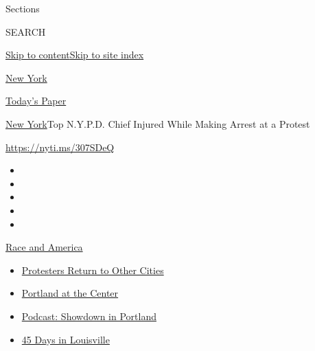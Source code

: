 Sections

SEARCH

\protect\hyperlink{site-content}{Skip to
content}\protect\hyperlink{site-index}{Skip to site index}

\href{https://www.nytimes3xbfgragh.onion/section/nyregion}{New York}

\href{https://myaccount.nytimes3xbfgragh.onion/auth/login?response_type=cookie\&client_id=vi}{}

\href{https://www.nytimes3xbfgragh.onion/section/todayspaper}{Today's
Paper}

\href{/section/nyregion}{New York}\textbar{}Top N.Y.P.D. Chief Injured
While Making Arrest at a Protest

\url{https://nyti.ms/307SDeQ}

\begin{itemize}
\item
\item
\item
\item
\item
\end{itemize}

\href{https://www.nytimes3xbfgragh.onion/news-event/george-floyd-protests-minneapolis-new-york-los-angeles?action=click\&pgtype=Article\&state=default\&region=TOP_BANNER\&context=storylines_menu}{Race
and America}

\begin{itemize}
\tightlist
\item
  \href{https://www.nytimes3xbfgragh.onion/2020/07/26/us/protests-portland-seattle-trump.html?action=click\&pgtype=Article\&state=default\&region=TOP_BANNER\&context=storylines_menu}{Protesters
  Return to Other Cities}
\item
  \href{https://www.nytimes3xbfgragh.onion/2020/07/24/us/portland-oregon-protests-white-race.html?action=click\&pgtype=Article\&state=default\&region=TOP_BANNER\&context=storylines_menu}{Portland
  at the Center}
\item
  \href{https://www.nytimes3xbfgragh.onion/2020/07/23/podcasts/the-daily/portland-protests.html?action=click\&pgtype=Article\&state=default\&region=TOP_BANNER\&context=storylines_menu}{Podcast:
  Showdown in Portland}
\item
  \href{https://www.nytimes3xbfgragh.onion/interactive/2020/07/16/us/black-lives-matter-protests-louisville-breonna-taylor.html?action=click\&pgtype=Article\&state=default\&region=TOP_BANNER\&context=storylines_menu}{45
  Days in Louisville}
\end{itemize}

